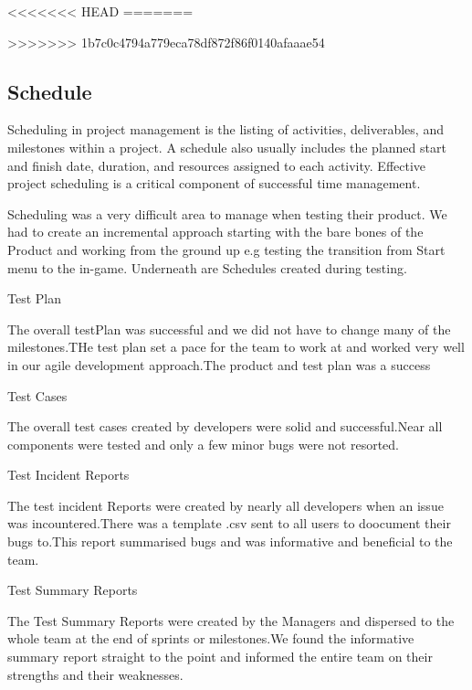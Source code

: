 <<<<<<< HEAD
=======

>>>>>>> 1b7c0c4794a779eca78df872f86f0140afaaae54
\subsection{Schedule}

Scheduling in project management is the listing of activities, deliverables, and milestones within a project. A schedule also usually includes the planned start and finish date, duration, and resources assigned to each activity. Effective project scheduling is a critical component of successful time management.

Scheduling was a very difficult area to manage when testing their product. We had to create an
incremental approach starting with the bare bones of the Product and working from the ground up
e.g testing the transition from Start menu to the in-game. Underneath are Schedules created during
testing.	


\begin{center}
\centerline{Test Plan}
\end{center}
The overall testPlan was successful and we did not have to change many of the milestones.THe test plan set a pace for the team to work at and worked very well in our agile development approach.The product and test plan was a success



\begin{center}
\centerline{Test Cases}
\end{center}
The overall test cases created by developers were solid and successful.Near all components were tested and only a few minor bugs were not resorted.


\begin{center}
\centerline{Test Incident Reports}
\end{center}
The test incident Reports were created by nearly all developers when an issue was incountered.There was a template .csv sent to all users to doocument their bugs to.This report summarised bugs and was informative and beneficial to the team.



\begin{center}
\centerline{Test Summary Reports}
\end{center}
The Test Summary Reports were created by the Managers and dispersed to the whole team at the end of sprints or milestones.We found the informative summary report straight to the point and informed the entire team on their strengths and their weaknesses.
